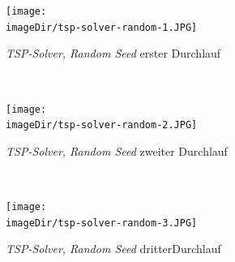 \documentclass[11pt, a4paper, twoside]{article}   	%
\newcommand{\imageDir}{images}
\begin{document}
\begin{figure}[h]
	\centering
	\texttt{[image: \\imageDir/tsp-solver-random-1.JPG]}
	\caption{\emph{TSP-Solver, Random Seed} erster Durchlauf}
\end{figure}

\ \newpage
\begin{figure}[h]
	\centering
	\texttt{[image: \\imageDir/tsp-solver-random-2.JPG]}
	\caption{\emph{TSP-Solver, Random Seed} zweiter Durchlauf}
\end{figure}

\ \newpage
\begin{figure}[h]
	\centering
	\texttt{[image: \\imageDir/tsp-solver-random-3.JPG]}
	\caption{\emph{TSP-Solver, Random Seed} dritterDurchlauf}
\end{figure}
\end{document}
